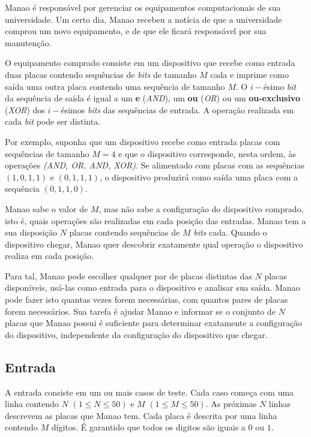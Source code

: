 Manao é responsável por gerenciar os equipamentos computacionais de sua
universidade. Um certo dia, Manao recebeu a notícia de que a universidade comprou um
novo equipamento, e de que ele ficará responsável por sua manutenção.

O equipamento comprado consiste em um dispositivo que recebe como entrada duas
placas contendo sequências de \textit{bits} de tamanho $M$ cada e imprime como saída uma outra
placa contendo uma sequência de tamanho $M$. O $i-$ésimo \textit{bit} da sequência de saída é igual a
um \textbf{e} (\textit{AND}), um \textbf{ou} (\textit{OR}) ou um
\textbf{ou-exclusivo} (\textit{XOR}) dos $i-$ésimos \textit{bits} das sequências
de entrada. A operação realizada em cada \textit{bit} pode ser distinta.

Por exemplo, suponha que um dispositivo recebe como entrada placas com sequências de tamanho $M = 4$
e que o dispositivo corresponde, nesta ordem, às operações \textit{(AND, OR, AND, XOR)}. Se
alimentado com placas com as sequências $(1,0,1,1)$ e $(0,1,1,1)$, o dispositivo
produzirá como saída uma placa com a sequência $(0,1,1,0)$.

Manao sabe o valor de $M$, mas não sabe a configuração do dispositivo comprado, isto é,
quais operações são realizadas em cada posição das entradas. Manao tem a sua
disposição $N$ placas contendo sequências de $M$ \textit{bits} cada. Quando o
dispositivo chegar, Manao quer descobrir exatamente qual operação o dispositivo
realiza em cada posição.

Para tal, Manao pode escolher qualquer par de placas distintas das $N$ placas
disponíveis, usá-las como entrada para o
dispositivo e analisar sua saída. Manao pode fazer isto quantas vezes forem
necessárias, com quantos pares de placas forem necessários.
Sua tarefa é ajudar Manao e informar se o conjunto de $N$ placas que Manao
possui é suficiente para determinar exatamente a configuração do dispositivo,
independente da configuração do dispositivo que chegar.

\subsection*{Entrada}

A entrada consiste em um ou mais casos de teste. Cada caso começa com uma linha
contendo $N$ $(1 \leq N \leq 50)$ e $M$ $(1 \leq M \leq 50)$. As próximas $N$
linhas descrevem as placas que Manao tem. Cada placa é descrita por uma linha
contendo $M$ dígitos. É garantido que todos os digitos são iguais a $0$ ou $1$.

